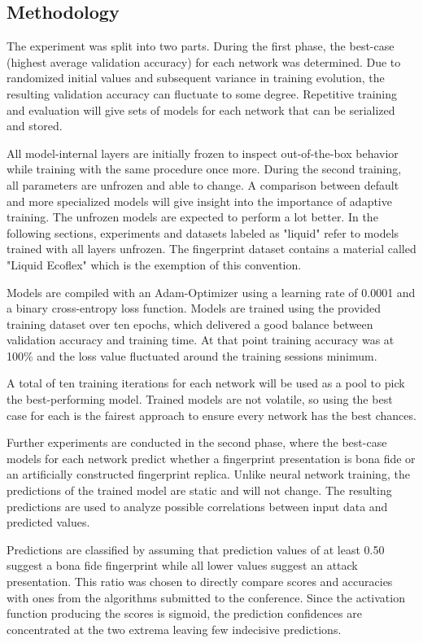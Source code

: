 


\subsection{Methodology}
The experiment was split into two parts.
During the first phase, the best-case (highest average validation accuracy) for each network was determined.
Due to randomized initial values and subsequent variance in training evolution, the resulting validation accuracy can fluctuate to some degree.
Repetitive training and evaluation will give sets of models for each network that can be serialized and stored.

All model-internal layers are initially frozen to inspect out-of-the-box behavior while training with the same procedure once more.
During the second training, all parameters are unfrozen and able to change.
A comparison between default and more specialized models will give insight into the importance of adaptive training.
The unfrozen models are expected to perform a lot better.
In the following sections, experiments and datasets labeled as "liquid" refer to models trained with all layers unfrozen.
The fingerprint dataset contains a material called "Liquid Ecoflex" which is the exemption of this convention.

Models are compiled with an Adam-Optimizer using a learning rate of 0.0001 and a binary cross-entropy loss function.
Models are trained using the provided training dataset over ten epochs, which delivered a good balance between validation accuracy and training time.
At that point training accuracy was at 100\% and the loss value fluctuated around the training sessions minimum.

A total of ten training iterations for each network will be used as a pool to pick the best-performing model.
Trained models are not volatile, so using the best case for each is the fairest approach to ensure every network has the best chances.

Further experiments are conducted in the second phase, where the best-case models for each network predict whether a fingerprint presentation is bona fide or an artificially constructed fingerprint replica.
Unlike neural network training, the predictions of the trained model are static and will not change.
The resulting predictions are used to analyze possible correlations between input data and predicted values.

Predictions are classified by assuming that prediction values of at least 0.50 suggest a bona fide fingerprint while all lower values suggest an attack presentation.
This ratio was chosen to directly compare scores and accuracies with ones from the algorithms submitted to the conference. \cite{LIVDET}
Since the activation function producing the scores is sigmoid, the prediction confidences are concentrated at the two extrema leaving few indecisive predictions.

